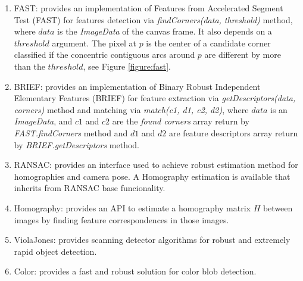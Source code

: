 \begin{enumerate}
  \item FAST: provides an implementation of Features from Accelerated Segment Test (FAST) \cite{Rosten2010} for features detection via \textit{findCorners(data, threshold)} method, where $data$ is the \textit{ImageData} of the canvas frame. It also depends on a $threshold$ argument. The pixel at $p$ is the center of a candidate corner classified if the concentric contiguous arcs around $p$ are different by more than the $threshold$, see Figure \ref{figure:fast}.

  \item BRIEF: provides an implementation of Binary Robust Independent Elementary Features (BRIEF) \cite{Calonder2010} for feature extraction via \textit{getDescriptors(data, corners)} method and matching via \textit{match(c1, d1, c2, d2)}, where $data$ is an \textit{ImageData}, and $c1$ and $c2$ are the \textit{found corners} array return by \textit{FAST.findCorners} method and $d1$ and $d2$ are feature descriptors array return by \textit{BRIEF.getDescriptors} method.
  \item RANSAC: provides an interface used to achieve robust estimation method for homographies and camera pose. A Homography estimation is available that inherits from RANSAC \cite{Hartley2004} base funcionality.
  \item Homography: provides an API to estimate a homography matrix $H$ between images by finding feature correspondences in those images.
  \item ViolaJones: provides scanning detector algorithms for robust and extremely rapid object detection.
  \item Color: provides a fast and robust solution for color blob detection.
\end{enumerate}

